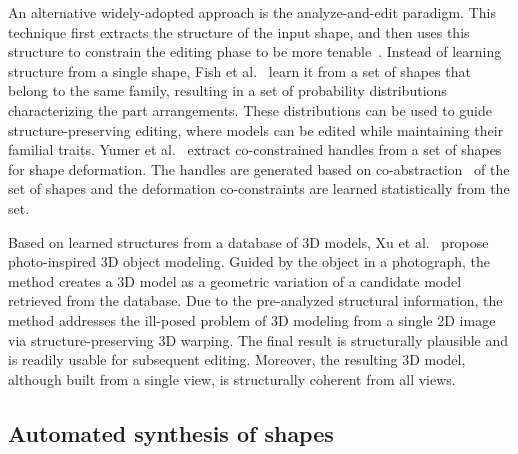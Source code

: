 An alternative widely-adopted approach is the analyze-and-edit paradigm.  This technique first extracts the structure of the input shape, and then uses this structure to constrain the editing phase to be more tenable~\cite{Gal:2009:IAA}.
Instead of learning structure from a single shape, Fish et al.~\cite{Fish:2014:MR} learn it from a set of shapes that belong to the same family, resulting in a set of probability distributions characterizing the part arrangements. These distributions can be used to guide structure-preserving editing, where models can be
edited while maintaining their familial traits.
Yumer et al.~\cite{Yumer:2014:CCH} extract co-constrained handles from a set of shapes for shape deformation.
The handles are generated based on co-abstraction~\cite{Yumer:2012:CSC} of the set of shapes and the deformation co-constraints are learned statistically from the set. 

Based on learned structures from a database of 3D models, Xu et al.~\cite{Xu:2011:PMO} propose photo-inspired 3D object modeling.
Guided by the object in a photograph, the method creates a 3D model as a geometric variation of a candidate model retrieved from the database.
Due to the pre-analyzed structural information, the method addresses the ill-posed problem of 3D modeling from a single 2D image
via structure-preserving 3D warping. The final result is structurally plausible and is readily usable for subsequent editing.
Moreover, the resulting 3D model, although built from a single view, is structurally coherent from all views.

\subsection{Automated synthesis of shapes}
\label{sec:synthesis}


